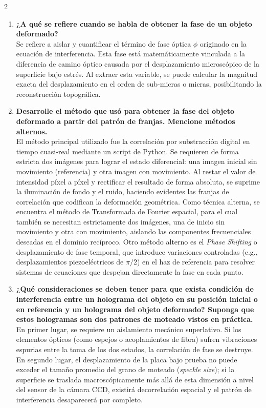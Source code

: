 \documentclass[letterpaper]{article}
\begin{document}
\begin{multicols}{2}
\begin{enumerate}
			\item \textbf{¿A qué se refiere cuando se habla de obtener la fase de un objeto deformado?}\\
			Se refiere a aislar y cuantificar el término de fase óptica $\phi$ originado en la ecuación de interferencia. Esta fase está matemáticamente vinculada a la diferencia de camino óptico causada por el desplazamiento microscópico de la superficie bajo estrés. Al extraer esta variable, se puede calcular la magnitud exacta del desplazamiento en el orden de sub-micras o micras, posibilitando la reconstrucción topográfica.
			
			\item \textbf{Desarrolle el método que usó para obtener la fase del objeto deformado a partir del patrón de franjas. Mencione métodos alternos.}\\
			El método principal utilizado fue la correlación por substracción digital en tiempo cuasi-real mediante un script de Python. Se requieren de forma estricta dos imágenes para lograr el estado diferencial: una imagen inicial sin movimiento (referencia) y otra imagen con movimiento. Al restar el valor de intensidad píxel a píxel y rectificar el resultado de forma absoluta, se suprime la iluminación de fondo y el ruido, haciendo evidentes las franjas de correlación que codifican la deformación geométrica. Como técnica alterna, se encuentra el método de Transformada de Fourier espacial, para el cual también se necesitan estrictamente dos imágenes, una de inicio sin movimiento y otra con movimiento, aislando las componentes frecuenciales deseadas en el dominio recíproco. Otro método alterno es el \textit{Phase Shifting} o desplazamiento de fase temporal, que introduce variaciones controladas (e.g., desplazamientos piezoeléctricos de $\pi/2$) en el haz de referencia para resolver sistemas de ecuaciones que despejan directamente la fase en cada punto.
			
			\item \textbf{¿Qué consideraciones se deben tener para que exista condición de interferencia entre un holograma del objeto en su posición inicial o en referencia y un holograma del objeto deformado? Suponga que estos hologramas son dos patrones de moteado vistos en práctica.}\\
			En primer lugar, se requiere un aislamiento mecánico superlativo. Si los elementos ópticos (como espejos o acoplamientos de fibra) sufren vibraciones espurias entre la toma de los dos estados, la correlación de fase se destruye. En segundo lugar, el desplazamiento de la placa bajo prueba no puede exceder el tamaño promedio del grano de moteado (\textit{speckle size}); si la superficie se traslada macroscópicamente más allá de esta dimensión a nivel del sensor de la cámara CCD, existirá decorrelación espacial y el patrón de interferencia desaparecerá por completo.
		\end{enumerate}
		

\end{multicols}
\end{document}
